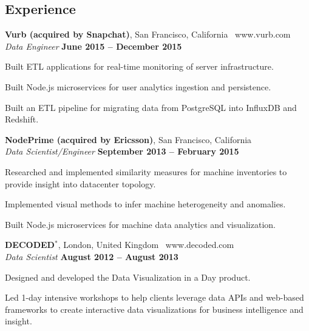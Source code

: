 \documentclass[margin,line]{resume}
\begin{document}
\begin{resume}


	\section{\mysidestyle Experience}

	\textbf{Vurb (acquired by Snapchat)}, San Francisco, California \textbar\ www.vurb.com \vspace{1mm}\\
	\textsl{Data Engineer} \hfill \textbf{June 2015 -- December 2015} \vspace{1mm}\\
	\vspace{-4mm}
	\begin{list2}
		\item Built ETL applications for real-time monitoring of server infrastructure.
		\item Built Node.js microservices for user analytics ingestion and persistence.
		\item Built an ETL pipeline for migrating data from PostgreSQL into InfluxDB and Redshift.
	\end{list2}
	\vspace{-1.5mm}

	\textbf{NodePrime (acquired by Ericsson)}, San Francisco, California \vspace{1mm}\\
	\textsl{Data Scientist/Engineer} \hfill \textbf{September 2013 -- February 2015} \vspace{1mm}\\
	\vspace{-4mm}
	\begin{list2}
		\item Researched and implemented similarity measures for machine inventories to provide insight into datacenter topology.
		\item  Implemented visual methods to infer machine heterogeneity and anomalies.
		\item Built Node.js microservices for machine data analytics and visualization.
	\end{list2}
	\vspace{-1.5mm}

	\textbf{DECODED$^*$}, London, United Kingdom \textbar\ www.decoded.com \vspace{1mm}\\
	\textsl{Data Scientist} \hfill \textbf{August 2012 -- August 2013} \vspace{1mm}\\
	\vspace{-4mm}
	\begin{list2}
		\item Designed and developed the Data Visualization in a Day product.
		\item Led 1-day intensive workshops to help clients leverage data APIs and web-based frameworks to create interactive data visualizations for business intelligence and insight.
	\end{list2}
	\vspace{-1.5mm}


\end{resume}
\end{document}
